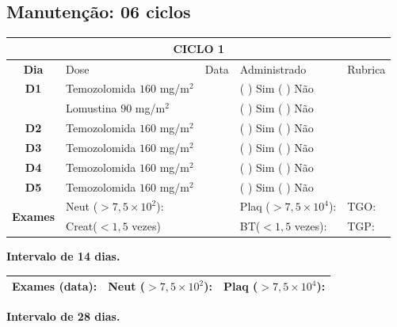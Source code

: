 \documentclass[11pt,a4paper,oldfontcommands]{memoir}
\begin{document}
\subsection{Manutenção: 06 ciclos}

\begin{center}
\begin{longtable}{p{1cm}p{4cm}|p{1cm}|p{4.6cm}|p{3cm}}
	\hline
	\multicolumn{5}{c}{\textbf{CICLO 1}}\\
\hline
    \multicolumn{1}{c|}{\multirow{1}{*}{\textbf{Dia}}}&{Dose}&{Data}&{Administrado}&{Rubrica} \\
    \hline
    \multicolumn{1}{c|}{\multirow{1}{*}{\textbf{D1}}}&{Temozolomida \(160\) mg/m\(^2\)}&&{(  ) Sim (  ) Não}&\\
    \multicolumn{1}{c|}{\multirow{1}{*}{\textbf{}}}&{Lomustina \(90\) mg/m\(^2\)}&&{(  ) Sim (  ) Não}&\\
    \multicolumn{1}{c|}{\multirow{1}{*}{\textbf{D2}}}&{Temozolomida \(160\) mg/m\(^2\)}&&{(  ) Sim (  ) Não}&\\
    \multicolumn{1}{c|}{\multirow{1}{*}{\textbf{D3}}}&{Temozolomida \(160\) mg/m\(^2\)}&&{(  ) Sim (  ) Não}&\\
    \multicolumn{1}{c|}{\multirow{1}{*}{\textbf{D4}}}&{Temozolomida \(160\) mg/m\(^2\)}&&{(  ) Sim (  ) Não}&\\
    \multicolumn{1}{c|}{\multirow{1}{*}{\textbf{D5}}}&{Temozolomida \(160\) mg/m\(^2\)}&&{(  ) Sim (  ) Não}&\\
    \hline
    \multicolumn{1}{c|}{\multirow{2}{*}{\textbf{Exames}}}&\multicolumn{2}{l|}{Neut (\(>7,5\times10^2\)):}&{Plaq (\(>7,5\times10^4\)):}&{TGO:}\\
    \cline{2-5}
    \multicolumn{1}{c|}{\multirow{2}{*}{{}}}&\multicolumn{2}{l|}{Creat(\(<1,5\) vezes)}&{BT(\(<1,5\) vezes):}&{TGP:}
    \\
    \hline
\end{longtable}
\textbf{Intervalo de 14 dias.}
\begin{longtable}{p{5cm}|p{5cm}|p{4.5cm}}
    \hline
    \textbf{Exames (data):}&{Neut (\(>7,5\times10^2\)):}&{Plaq (\(>7,5\times10^4\)):}
    \\
    \hline
\end{longtable}
\textbf{Intervalo de 28 dias.}
\\[1.5cm]
\end{center}
\end{document}
